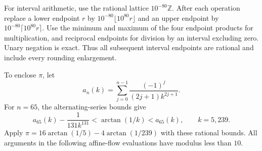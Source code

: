 \documentclass[11pt,a4paper]{article}
\begin{document}
For interval arithmetic, use the rational lattice $10^{-80}\mathbb Z$.
After each operation replace a lower endpoint $r$ by
$10^{-80}\lfloor10^{80}r\rfloor$ and an upper endpoint by
$10^{-80}\lceil10^{80}r\rceil$. Use the minimum and maximum of the four
endpoint products for multiplication, and reciprocal endpoints for
division by an interval excluding zero. Unary negation is exact.
Thus all subsequent interval endpoints are rational and include every
rounding enlargement.

To enclose $\pi$, let
\[
 a_n(k)=\sum_{j=0}^{n-1}\frac{(-1)^j}{(2j+1)k^{2j+1}}.
\]
For $n=65$, the alternating-series bounds give
\[
 a_{65}(k)-\frac1{131k^{131}}
 <\arctan(1/k)<a_{65}(k),\qquad k=5,239.
\]
Apply $\pi=16\arctan(1/5)-4\arctan(1/239)$ with these rational bounds.
All arguments in the following affine-flow evaluations have modulus
less than $10$.
\end{document}
